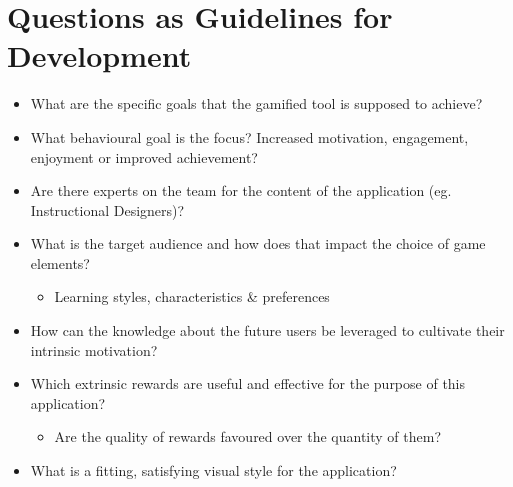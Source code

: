 \section*{Questions as Guidelines for Development}
\begin{itemize}
    \item What are the specific goals that the gamified tool is supposed to achieve?
    \item What behavioural goal is the focus? Increased motivation, engagement, enjoyment or improved achievement?
    \item Are there experts on the team for the content of the application (eg. Instructional Designers)?
    \item What is the target audience and how does that impact the choice of game elements?
    \begin{itemize}
        \item Learning styles, characteristics \& preferences
    \end{itemize}
    \item How can the knowledge about the future users be leveraged to cultivate their intrinsic motivation?
    \item Which extrinsic rewards are useful and effective for the purpose of this application?
    \begin{itemize}
        \item Are the quality of rewards favoured over the quantity of them?
    \end{itemize}
    \item What is a fitting, satisfying visual style for the application?
\end{itemize}

